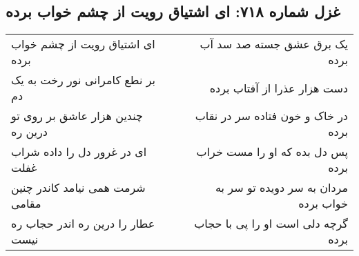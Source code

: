 \begin{center}
\section*{غزل شماره ۷۱۸: ای اشتیاق رویت از چشم خواب برده}
\label{sec:718}
\begin{longtable}{l p{0.5cm} r}
ای اشتیاق رویت از چشم خواب برده
&&
یک برق عشق جسته صد سد آب برده
\\
بر نطع کامرانی نور رخت به یک دم
&&
دست هزار عذرا از آفتاب برده
\\
چندین هزار عاشق بر روی تو درین ره
&&
در خاک و خون فتاده سر در نقاب برده
\\
ای در غرور دل را داده شراب غفلت
&&
پس دل بده که او را مست خراب برده
\\
شرمت همی نیامد کاندر چنین مقامی
&&
مردان به سر دویده تو سر به خواب برده
\\
عطار را درین ره اندر حجاب ره نیست
&&
گرچه دلی است او را پی با حجاب برده
\\
\end{longtable}
\end{center}
